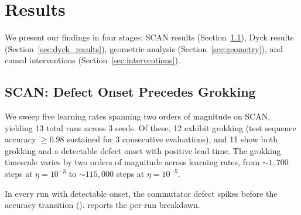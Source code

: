 \documentclass[11pt]{article}
\begin{document}
\section{Results}
\label{sec:results}

We present our findings in four stages: SCAN results (Section~\ref{sec:scan_results}), Dyck results (Section~\ref{sec:dyck_results}), geometric analysis (Section~\ref{sec:geometry}), and causal interventions (Section~\ref{sec:interventions}).

\subsection{SCAN: Defect Onset Precedes Grokking}
\label{sec:scan_results}

We sweep five learning rates spanning two orders of magnitude on SCAN, yielding 13 total runs across 3 seeds. Of these, 12 exhibit grokking (test sequence accuracy $\geq 0.98$ sustained for 3 consecutive evaluations), and 11 show both grokking and a detectable defect onset with positive lead time. The grokking timescale varies by two orders of magnitude across learning rates, from ${\sim}1{,}700$ steps at $\eta = 10^{-3}$ to ${\sim}115{,}000$ steps at $\eta = 10^{-5}$.

In every run with detectable onset, the commutator defect spikes before the accuracy transition ().  reports the per-run breakdown.
\end{document}
